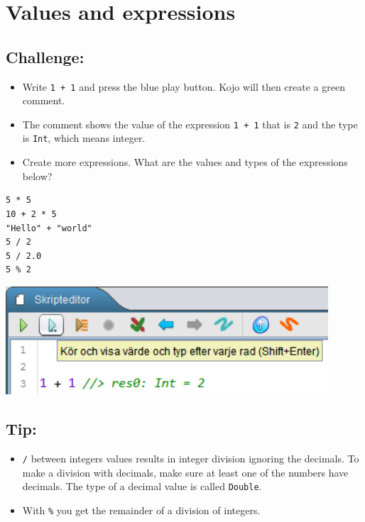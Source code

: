 \chapter{Values and expressions}
\begin{multicols}{2}
\section*{\color{BrickRed}Challenge:}


\begin{itemize}

\item {Write \lstinline{1 + 1} and press the blue play button. Kojo will then create a green comment.}
\item {The comment shows the value of the expression \lstinline{1 + 1} that is \lstinline{2} and the type is \lstinline{Int}, which means integer.}
\item {Create more expressions. What are the values and types of the expressions below?}

\end{itemize}



\begin{lstlisting}[numbers=none]
5 * 5
10 + 2 * 5
"Hello" + "world"
5 / 2
5 / 2.0
5 % 2
\end{lstlisting}
        


\columnbreak


\includegraphics[width=12.0cm]{../img/show-value.png}
\section*{\color{OliveGreen}Tip:}


\begin{itemize}

\item {\lstinline{/} between integers values results in integer division ignoring the decimals. To make a division with decimals, make sure at least one of the numbers have decimals. The type of a decimal value is called \lstinline{Double}.}
\item {With \lstinline{%} you get the remainder of a division of integers.}

\end{itemize}


\end{multicols}

